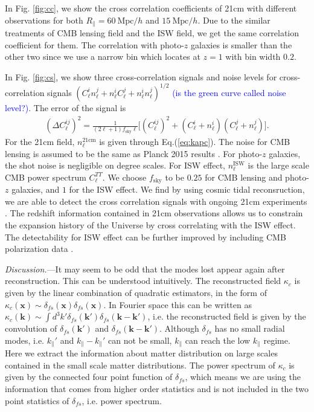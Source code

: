 \documentclass[aps,prl,twocolumn,showpacs,superscriptaddress,groupedaddress,nofootinbib]{revtex4}  %
\newcommand{\mr}{\mathrm}
\newcommand{\tcb}{\textcolor{blue}}
\begin{document}
In Fig. \ref{fig:cc}, we show the cross correlation coefficients of 21cm with 
different observations for both $R_\parallel=60\ \mr{Mpc}/h$ and 
$15\ \mr{Mpc}/h$. Due to the similar treatments of CMB lensing field
and the ISW field, we get the same correlation coefficient for them. 
The correlation with photo-$z$ galaxies is smaller than the other
two since we use a narrow bin which locates at $z=1$ with bin width $0.2$.

In Fig. \ref{fig:cs}, we show three cross-correlation signals and noise
levels for cross-correlation signals 
$(C_\ell^in_\ell^j+n_\ell^iC_\ell^j+n^i_\ell n^j_\ell)^{1/2}$
\tcb{(is the green curve called noise level?)}. The error of  
the signal is 
\begin{eqnarray}
(\Delta C_\ell^{ij})^2=\frac{1}{(2\ell+1)f_\mr{sky}\ell}
\bigg[{(C_\ell^{ij})^2+(C_\ell^{i}+n_\ell^{i})
(C_\ell^{j}+n_\ell^{j})}\bigg].
\end{eqnarray}
For the 21cm field, $n_\ell^\mr{21cm}$ is given through Eq.(\ref{eq:kapc}). 
The noise for CMB lensing is assumed to be the same as Planck 2015 results 
\cite{2015:plancklensing}. For photo-$z$ galaxies, the shot noise is negligible
on degree scales. For ISW effect, $n_\ell^\mr{ISW}$ is the large scale
CMB power spectrum $C_\ell^{TT}$. We choose $f_\mr{sky}$ to be $0.25$ for 
CMB lensing and photo-$z$ galaxies, and $1$ for the ISW effect. We find by
using cosmic tidal reconsruction, we are able to detect the cross correlation
signals with ongoing 21cm experiments \cite{2014SPIE.9145E..22B,2014SPIE.9145E..4VN,2012IJMPS..12..256C,2015ApJ...798...40X}. 
The redshift information contained in 21cm observations allows us to constrain
the expansion history of the Universe by cross correlating with the ISW effect.
The detectability for ISW effect can be further improved by including CMB 
polarization data \cite{2011PhRvD..83f3001L}.

{\it Discussion.}---It may seem to be odd that the modes lost appear again
after reconstruction. This can be understood intuitively.
The reconstructed field $\kappa_c$ is given by the linear combination of 
quadratic estimators, in the form of 
$\kappa_c(\bm{x})\sim\delta_{fs}(\bm{x})\delta_{fs}(\bm{x})$. In Fourier 
space this can be written as $\kappa_c(\bm{k})\sim\int d^3k'
\delta_{fs}(\bm{k}')\delta_{fs}(\bm{k}-\bm{k}')$, i.e. the reconstructed 
field is given by the convolution of $\delta_{fs}(\bm{k}')$ and 
$\delta_{fs}(\bm{k}-\bm{k}')$. Although $\delta_{fs}$ has no small radial
modes, i.e. $k_{\parallel}'$ and $k_\parallel-k_{\parallel}'$ can not be small,
$k_\parallel$ can reach the low $k_\parallel$ regime.
Here we extract the information about matter distribution on large scales 
contained in the small scale matter distributions. The power spectrum of 
$\kappa_c$ is given by the connected four point function of $\delta_{fs}$,
which means we are using the information that comes from higher order statistics
and is not included in the two point statistics of $\delta_{fs}$, i.e. 
power spectrum.
\end{document}
